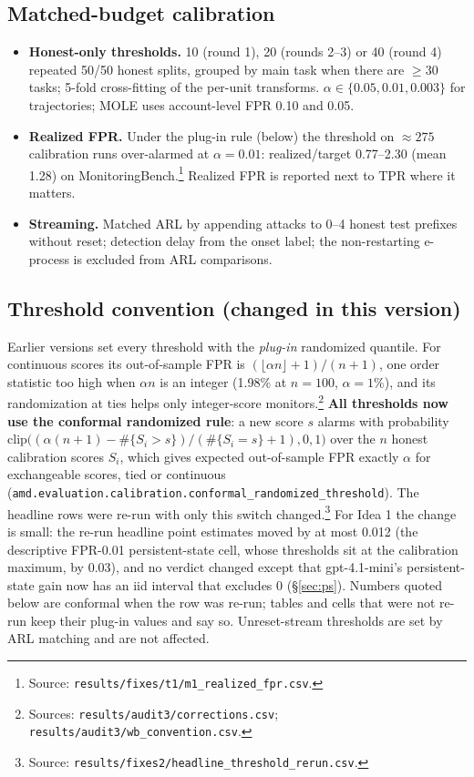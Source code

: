 \documentclass[11pt]{article}
\newcommand{\src}[1]{\footnote{Source: \nolinkurl{#1}.}}
\newcommand{\srcs}[2]{\footnote{Sources: \nolinkurl{#1}; \nolinkurl{#2}.}}
\begin{document}
\subsection{Matched-budget calibration}
\begin{itemize}
\item \textbf{Honest-only thresholds.} 10 (round 1), 20 (rounds 2--3) or 40 (round 4) repeated 50/50 honest splits, grouped by main task when there are $\ge30$ tasks; 5-fold cross-fitting of the per-unit transforms. $\alpha\in\{0.05,0.01,0.003\}$ for trajectories; MOLE uses account-level FPR 0.10 and 0.05.
\item \textbf{Realized FPR.} Under the plug-in rule (below) the threshold on $\approx275$ calibration runs over-alarmed at $\alpha=0.01$: realized/target 0.77--2.30 (mean 1.28) on MonitoringBench.\src{results/fixes/t1/m1_realized_fpr.csv} Realized FPR is reported next to TPR where it matters.
\item \textbf{Streaming.} Matched ARL by appending attacks to 0--4 honest test prefixes without reset; detection delay from the onset label; the non-restarting e-process is excluded from ARL comparisons.
\end{itemize}

\subsection{Threshold convention (changed in this version)}\label{sec:thr}
Earlier versions set every threshold with the \emph{plug-in} randomized quantile. For continuous scores its out-of-sample FPR is $(\lfloor\alpha n\rfloor+1)/(n+1)$, one order statistic too high when $\alpha n$ is an integer (1.98\% at $n=100$, $\alpha=1\%$), and its randomization at ties helps only integer-score monitors.\srcs{results/audit3/corrections.csv}{results/audit3/wb_convention.csv} \textbf{All thresholds now use the conformal randomized rule}: a new score $s$ alarms with probability $\mathrm{clip}\bigl((\alpha(n+1)-\#\{S_i>s\})/(\#\{S_i=s\}+1),0,1\bigr)$ over the $n$ honest calibration scores $S_i$, which gives expected out-of-sample FPR exactly $\alpha$ for exchangeable scores, tied or continuous (\texttt{amd.evaluation.calibration.conformal\_randomized\_threshold}). The headline rows were re-run with only this switch changed.\src{results/fixes2/headline_threshold_rerun.csv} For Idea 1 the change is small: the re-run headline point estimates moved by at most 0.012 (the descriptive FPR-0.01 persistent-state cell, whose thresholds sit at the calibration maximum, by 0.03), and no verdict changed except that gpt-4.1-mini's persistent-state gain now has an iid interval that excludes 0 (\S\ref{sec:ps}). Numbers quoted below are conformal when the row was re-run; tables and cells that were not re-run keep their plug-in values and say so. Unreset-stream thresholds are set by ARL matching and are not affected.
\end{document}
